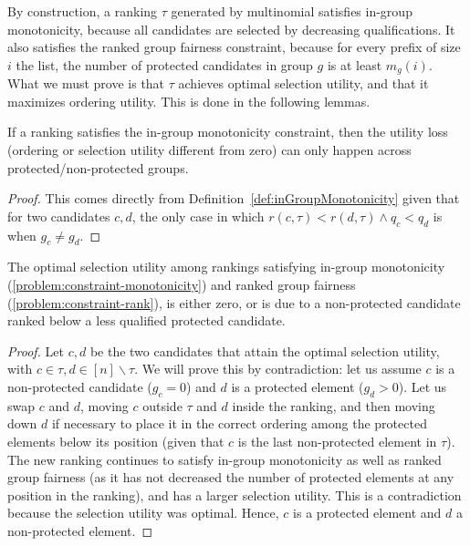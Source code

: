 By construction, a ranking $\tau$ generated by multinomial \algoFAIR satisfies in-group monotonicity, because all candidates are selected by decreasing qualifications.
%
It also satisfies the ranked group fairness constraint, because for every prefix of size $i$ the list, the number of protected candidates in group $g$ is at least $m_g(i)$. 
%
What we must prove is that $\tau$ achieves optimal selection utility, and that it maximizes ordering utility. 
%
This is done in the following lemmas.

\begin{lemma}\label{lemma:across}
	If a ranking satisfies the in-group monotonicity constraint, then the utility loss (ordering or selection utility different from zero) can only happen across protected/non-protected groups.
\end{lemma}

\begin{proof}
	This comes directly from Definition~\ref{def:inGroupMonotonicity} given that for two candidates $c,d$, the only case in which $r(c,\tau) < r(d,\tau) \wedge q_c < q_d$ is when $g_c \ne g_d$.
\end{proof}

\begin{lemma}
	The optimal selection utility among rankings satisfying in-group monotonicity (\ref{problem:constraint-monotonicity}) and ranked group fairness (\ref{problem:constraint-rank}), is either zero, or is due to a non-protected candidate ranked below a less qualified protected candidate.
\end{lemma}

\begin{proof}
	Let $c,d$ be the two candidates that attain the optimal selection utility, with $c \in \tau, d \in [n] \backslash \tau$.
	We will prove this by contradiction: let us assume $c$ is a non-protected candidate ($g_c=0$) and $d$ is a protected element ($g_d>0$). 
	Let us swap $c$ and $d$, moving $c$ outside $\tau$ and $d$ inside the ranking, and then moving down $d$ if necessary to place it in the correct ordering among the protected elements below its position (given that $c$ is the last non-protected element in $\tau$). 
	The new ranking continues to satisfy in-group monotonicity as well as ranked group fairness (as it has not decreased the number of protected elements at any position in the ranking), and has a larger selection utility. 
	This is a contradiction because the selection utility was optimal. Hence, $c$ is a protected element and $d$ a non-protected element.
\end{proof}

